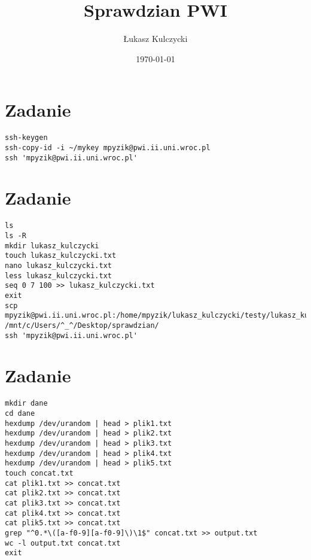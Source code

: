 \documentclass[a4paper]{article}
\author{Łukasz Kulczycki}
\title{Sprawdzian PWI}
\date{\today}
\begin{document}
\maketitle

\section{Zadanie}
\begin{verbatim}
ssh-keygen
ssh-copy-id -i ~/mykey mpyzik@pwi.ii.uni.wroc.pl
ssh 'mpyzik@pwi.ii.uni.wroc.pl'
\end{verbatim}

\section{Zadanie}
\begin{verbatim}
ls
ls -R
mkdir lukasz_kulczycki
touch lukasz_kulczycki.txt
nano lukasz_kulczycki.txt
less lukasz_kulczycki.txt
seq 0 7 100 >> lukasz_kulczycki.txt
exit
scp mpyzik@pwi.ii.uni.wroc.pl:/home/mpyzik/lukasz_kulczycki/testy/lukasz_kulczycki.txt 
/mnt/c/Users/^_^/Desktop/sprawdzian/
ssh 'mpyzik@pwi.ii.uni.wroc.pl'
\end{verbatim}

\section{Zadanie}
\begin{verbatim}
mkdir dane
cd dane
hexdump /dev/urandom | head > plik1.txt
hexdump /dev/urandom | head > plik2.txt
hexdump /dev/urandom | head > plik3.txt
hexdump /dev/urandom | head > plik4.txt
hexdump /dev/urandom | head > plik5.txt
touch concat.txt
cat plik1.txt >> concat.txt
cat plik2.txt >> concat.txt
cat plik3.txt >> concat.txt
cat plik4.txt >> concat.txt
cat plik5.txt >> concat.txt
grep "^0.*\([a-f0-9][a-f0-9]\)\1$" concat.txt >> output.txt
wc -l output.txt concat.txt
exit
\end{verbatim}
\end{document}
